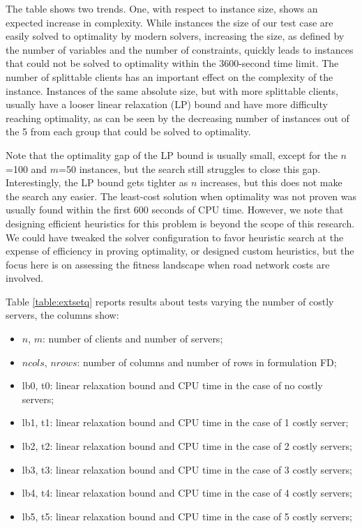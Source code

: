 \documentclass[ijoc,sglanonrev]{informs4}
\begin{document}
The table shows two trends. One, with respect to instance size, shows an expected increase in complexity. While instances the size of our test case are easily solved to optimality by modern solvers, increasing the size, as defined by the number of variables and the number of constraints, quickly leads to instances that could not be solved to optimality within the 3600-second time limit. 
The number of splittable clients has an important effect on the complexity of the instance. Instances of the same absolute size, but with more splittable clients, usually have a looser linear relaxation (LP) bound and have more difficulty reaching optimality, as can be seen by the decreasing number of instances out of the 5 from each group that could be solved to optimality.

Note that the optimality gap of the LP bound is usually small, except for the $n$=100 and $m$=50 instances, but the search still struggles to close this gap. Interestingly, the LP bound gets tighter as $n$ increases, but this does not make the search any easier.
The least-cost solution when optimality was not proven was usually found within the first 600 seconds of CPU time. However, we note that designing efficient heuristics for this problem is beyond the scope of this research. We could have tweaked the solver configuration to favor heuristic search at the expense of efficiency in proving optimality, or designed custom heuristics, but the focus here is on assessing the fitness landscape when road network costs are involved.

Table \ref{table:extsetq} reports results about tests varying the number of costly servers, the columns show:
\begin{itemize}
    \item $n$, $m$: number of clients and number of servers;
    \item $ncols$, $nrows$: number of columns and number of rows in formulation FD;
    \item lb0, t0: linear relaxation bound and CPU time in the case of no costly servers;
    \item lb1, t1: linear relaxation bound and CPU time in the case of 1 costly server;
    \item lb2, t2: linear relaxation bound and CPU time in the case of 2 costly servers;
    \item lb3, t3: linear relaxation bound and CPU time in the case of 3 costly servers;
    \item lb4, t4: linear relaxation bound and CPU time in the case of 4 costly servers;
    \item lb5, t5: linear relaxation bound and CPU time in the case of 5 costly servers;
\end{itemize}
\end{document}
